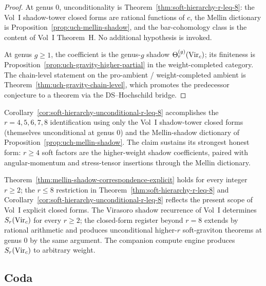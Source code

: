 \begin{proof}
At genus $0$, unconditionality is
Theorem~\ref{thm:soft-hierarchy-r-leq-8}: the Vol~I shadow-tower closed
forms are rational functions of $c$, the Mellin dictionary is
Proposition~\ref{prop:uch-mellin-shadow}, and the bar-cohomology class
is the content of Vol~I Theorem~H. No additional hypothesis is invoked.

At genus $g \geq 1$, the coefficient is the genus-$g$ shadow
$\Theta_r^{(g)}(\mathrm{Vir}_c)$; its finiteness is
Proposition~\ref{prop:uch-gravity-higher-partial} in the
weight-completed category. The chain-level statement on the
pro-ambient / weight-completed ambient is
Theorem~\ref{thm:uch-gravity-chain-level}, which promotes the
predecessor conjecture to a theorem via the DS--Hochschild bridge.
\end{proof}

\begin{remark}
\label{rem:smsb-strongest-form}
Corollary~\ref{cor:soft-hierarchy-unconditional-r-leq-8} accomplishes
the $r = 4, 5, 6, 7, 8$ identification using only the Vol~I
shadow-tower closed forms (themselves unconditional at
genus $0$) and the Mellin-shadow dictionary of
Proposition~\ref{prop:uch-mellin-shadow}. The claim sustains its
strongest honest form: $r \geq 4$ soft factors are the higher-weight
shadow coefficients, paired with angular-momentum and stress-tensor
insertions through the Mellin dictionary.
\end{remark}

\begin{remark}[Beyond $r = 8$]
\label{rem:smsb-beyond-r-eq-8}
Theorem~\ref{thm:mellin-shadow-correspondence-explicit} holds for every
integer $r \geq 2$; the $r \leq 8$ restriction in
Theorem~\ref{thm:soft-hierarchy-r-leq-8} and
Corollary~\ref{cor:soft-hierarchy-unconditional-r-leq-8} reflects the
present scope of Vol~I explicit closed forms. The Virasoro shadow
recurrence of Vol~I determines $S_r(\mathrm{Vir}_c)$ for
every $r \geq 2$; the closed-form register beyond $r = 8$ extends by
rational arithmetic and produces unconditional
higher-$r$ soft-graviton theorems at genus $0$ by the same argument.
The companion compute engine produces $S_r(\mathrm{Vir}_c)$ to arbitrary
weight.
\end{remark}

\subsection*{Coda}

